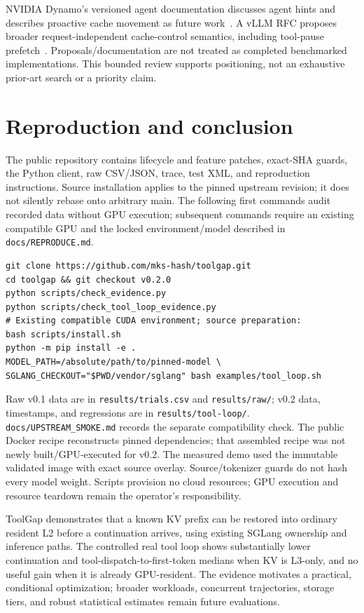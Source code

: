 \documentclass[10pt,a4paper]{article}
\newcommand{\code}[1]{\texttt{#1}}
\newcommand{\pagemark}{\newpage}
\begin{document}
NVIDIA Dynamo's versioned agent documentation discusses agent hints and describes proactive cache movement as future work~\cite{dynamo}. A vLLM RFC proposes broader request-independent cache-control semantics, including tool-pause prefetch~\cite{vllmrfc}. Proposals/documentation are not treated as completed benchmarked implementations. This bounded review supports positioning, not an exhaustive prior-art search or a priority claim.

\pagemark
\section{Reproduction and conclusion}
The public repository contains lifecycle and feature patches, exact-SHA guards, the Python client, raw CSV/JSON, trace, test XML, and reproduction instructions. Source installation applies to the pinned upstream revision; it does not silently rebase onto arbitrary main. The following first commands audit recorded data without GPU execution; subsequent commands require an existing compatible GPU and the locked environment/model described in \code{docs/REPRODUCE.md}.

\begin{lstlisting}
git clone https://github.com/mks-hash/toolgap.git
cd toolgap && git checkout v0.2.0
python scripts/check_evidence.py
python scripts/check_tool_loop_evidence.py
# Existing compatible CUDA environment; source preparation:
bash scripts/install.sh
python -m pip install -e .
MODEL_PATH=/absolute/path/to/pinned-model \
SGLANG_CHECKOUT="$PWD/vendor/sglang" bash examples/tool_loop.sh
\end{lstlisting}

Raw v0.1 data are in \code{results/trials.csv} and \code{results/raw/}; v0.2 data, timestamps, and regressions are in \code{results/tool-loop/}. \code{docs/UPSTREAM\_SMOKE.md} records the separate compatibility check. The public Docker recipe reconstructs pinned dependencies; that assembled recipe was not newly built/GPU-executed for v0.2. The measured demo used the immutable validated image with exact source overlay. Source/tokenizer guards do not hash every model weight. Scripts provision no cloud resources; GPU execution and resource teardown remain the operator's responsibility.

ToolGap demonstrates that a known KV prefix can be restored into ordinary resident L2 before a continuation arrives, using existing SGLang ownership and inference paths. The controlled real tool loop shows substantially lower continuation and tool-dispatch-to-first-token medians when KV is L3-only, and no useful gain when it is already GPU-resident. The evidence motivates a practical, conditional optimization; broader workloads, concurrent trajectories, storage tiers, and robust statistical estimates remain future evaluations.
\end{document}
